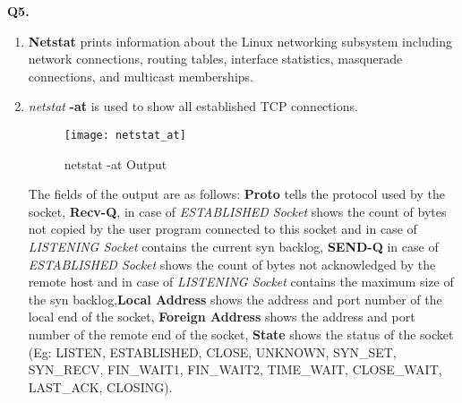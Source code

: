 \documentclass[12pt]{report}
\begin{document}
	\vspace*{10px}
	\large{\textbf{Q5.}}
	\linebreak[1]
	\normalsize{}
	\begin{enumerate}[label=\textbf{(\alph*)}]
		\item \textbf{Netstat} prints information about the Linux networking subsystem including network connections, routing tables, interface statistics, masquerade connections, and multicast memberships.
		
		\item \textit{netstat} \textbf{-at} is used to show all established TCP connections.\\[1pt]
		\begin{figure}[H]
			\centering
			\texttt{[image: netstat\_at]}
			\caption{netstat -at Output}
		\end{figure}
		The fields of the output are as follows: \textbf{Proto} tells the protocol used by the socket, \textbf{Recv-Q}, in case of \textit{ESTABLISHED Socket} shows the count of bytes not copied by the user program connected to this socket and in case of \textit{LISTENING Socket} contains the current syn backlog, \textbf{SEND-Q} in case of \textit{ESTABLISHED Socket} shows the count of bytes not acknowledged by the remote host and in case of \textit{LISTENING Socket} contains the maximum size of the syn backlog,\textbf{Local Address} shows the address and port number of the local end of the socket, \textbf{Foreign Address} shows the address and port number of the remote end of the socket, \textbf{State} shows the status of the socket (Eg: LISTEN, ESTABLISHED, CLOSE, UNKNOWN, SYN\_SET, SYN\_RECV, FIN\_WAIT1, FIN\_WAIT2, TIME\_WAIT, CLOSE\_WAIT, LAST\_ACK, CLOSING).
	

\end{enumerate}
\end{document}
